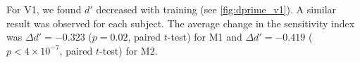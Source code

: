 

For \ac{V1}, we found $d'$ decreased with training (see \autoref{fig:dprime_v1}).
A similar result was observed for each subject.
The average change in the sensitivity index was $\Delta d' = -0.323$ ($p=0.02$, paired $t$-test) for \ac{M1} and $\Delta d' = -0.419$ ($p < 4 \times 10 ^{-7}$, paired $t$-test) for \ac{M2}.


